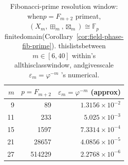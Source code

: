 \begin{table}[H]
\centering
\scriptsize
\setlength{\tabcolsep}{6pt}
\caption{Fibonacci-prime resolution window: when$p=F_{m+2}$ primeat,$(X_m,\boxplus_m,\boxtimes_m)\cong \mathbb{F}_p$ finitedomain(Corollary~\ref{cor:field-phase-fib-prime}). thislistsbetween$m\in[6,40]$ within's allthisclasswindow, andgivesscale$\varepsilon_m=\varphi^{-m}$ 's numerical.}
\label{tab:fib_prime_resolution_windows}
\begin{tabular}{r r r}
\toprule
$m$ & $p=F_{m+2}$ & $\varepsilon_m=\varphi^{-m}$ (approx)\\
\midrule
9 & 89 & $1.3156\times 10^{-2}$\\
11 & 233 & $5.025\times 10^{-3}$\\
15 & 1597 & $7.3314\times 10^{-4}$\\
21 & 28657 & $4.0856\times 10^{-5}$\\
27 & 514229 & $2.2768\times 10^{-6}$\\
\bottomrule
\end{tabular}
\end{table}
